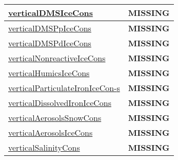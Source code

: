 {\begin{center}
\begin{longtable}{| p{2.0in} | p{4.0in} |}
    \hyperref[subsec:var_sec_tracer_conservation_verticalDMSIceCons]{verticalDMSIceCons} & {\bf \color{red} MISSING} \\
    \hline
    \hyperref[subsec:var_sec_tracer_conservation_verticalDMSPpIceCons]{verticalDMSPpIceCons} & {\bf \color{red} MISSING} \\
    \hline
    \hyperref[subsec:var_sec_tracer_conservation_verticalDMSPdIceCons]{verticalDMSPdIceCons} & {\bf \color{red} MISSING} \\
    \hline
    \hyperref[subsec:var_sec_tracer_conservation_verticalNonreactiveIceCons]{verticalNonreactiveIceCons} & {\bf \color{red} MISSING} \\
    \hline
    \hyperref[subsec:var_sec_tracer_conservation_verticalHumicsIceCons]{verticalHumicsIceCons} & {\bf \color{red} MISSING} \\
    \hline
    \hyperref[subsec:var_sec_tracer_conservation_verticalParticulateIronIceCons]{verticalParticulateIronIceCon-}\hyperref[subsec:var_sec_tracer_conservation_verticalParticulateIronIceCons]{s  }& {\bf \color{red} MISSING} \\
    \hline
    \hyperref[subsec:var_sec_tracer_conservation_verticalDissolvedIronIceCons]{verticalDissolvedIronIceCons} & {\bf \color{red} MISSING} \\
    \hline
    \hyperref[subsec:var_sec_tracer_conservation_verticalAerosolsSnowCons]{verticalAerosolsSnowCons} & {\bf \color{red} MISSING} \\
    \hline
    \hyperref[subsec:var_sec_tracer_conservation_verticalAerosolsIceCons]{verticalAerosolsIceCons} & {\bf \color{red} MISSING} \\
    \hline
    \hyperref[subsec:var_sec_tracer_conservation_verticalSalinityCons]{verticalSalinityCons} & {\bf \color{red} MISSING} \\
    \hline
\end{longtable}
\end{center}
}
